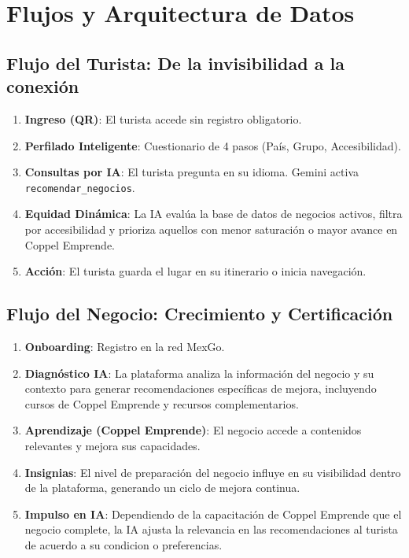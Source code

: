 \documentclass[11pt,a4paper]{article}
\begin{document}
\section{Flujos y Arquitectura de Datos}

\subsection{Flujo del Turista: De la invisibilidad a la conexión}

\begin{enumerate}[leftmargin=*, itemsep=2pt]
  \item \textbf{Ingreso (QR)}: El turista accede sin registro obligatorio.
  \item \textbf{Perfilado Inteligente}: Cuestionario de 4 pasos (País, Grupo, Accesibilidad).
  \item \textbf{Consultas por IA}: El turista pregunta en su idioma. Gemini activa \texttt{recomendar\_negocios}.
  \item \textbf{Equidad Dinámica}: La IA evalúa la base de datos de negocios activos, filtra por accesibilidad y prioriza aquellos con menor saturación o mayor avance en Coppel Emprende.
  \item \textbf{Acción}: El turista guarda el lugar en su itinerario o inicia navegación.
\end{enumerate}

\subsection{Flujo del Negocio: Crecimiento y Certificación}

\begin{enumerate}[leftmargin=*, itemsep=2pt]
  \item \textbf{Onboarding}: Registro en la red MexGo.
  \item \textbf{Diagnóstico IA}: La plataforma analiza la información del negocio y su contexto para generar recomendaciones específicas de mejora, incluyendo cursos de Coppel Emprende y recursos complementarios.
  \item \textbf{Aprendizaje (Coppel Emprende)}: El negocio accede a contenidos relevantes y mejora sus capacidades.
  \item \textbf{Insignias}: El nivel de preparación del negocio influye en su visibilidad dentro de la plataforma, generando un ciclo de mejora continua.
  \item \textbf{Impulso en IA}: Dependiendo de la capacitación de Coppel Emprende que el negocio complete, la IA ajusta la relevancia en las recomendaciones al turista de acuerdo a su condicion o preferencias.
\end{enumerate}
\end{document}
